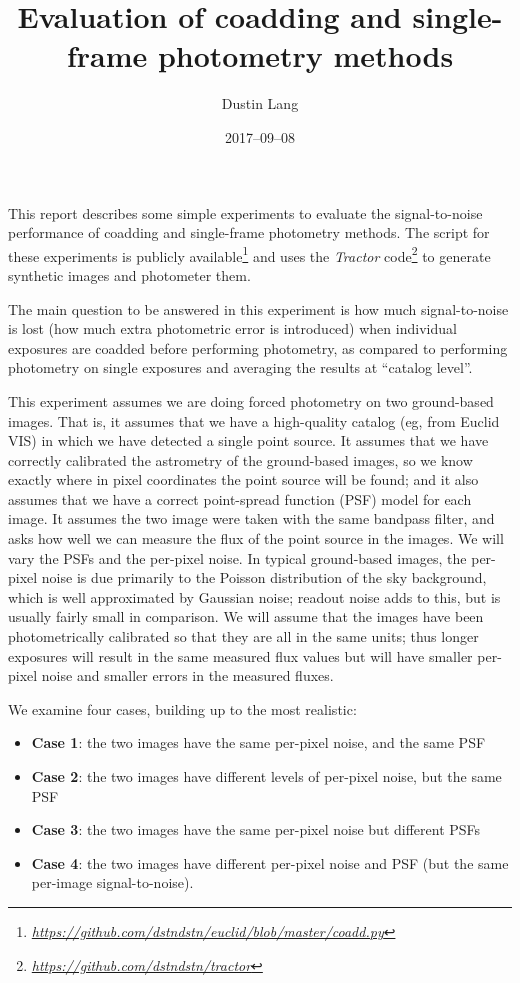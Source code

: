 \documentclass[a4paper,11pt]{article}
\author{Dustin Lang}
\date{2017--09--08}
\title{Evaluation of coadding and single-frame photometry methods}
\newcommand{\niceurl}[1]{\href{#1}{\textsl{#1}}}
\newcommand{\code}[1]{\textsl{#1}}
\begin{document}
\maketitle

This report describes some simple experiments to evaluate the
signal-to-noise performance of coadding and single-frame photometry
methods.  The script for these experiments is publicly
available\footnote{%
  \niceurl{https://github.com/dstndstn/euclid/blob/master/coadd.py}}
and uses the \code{Tractor} code\footnote{%
  \niceurl{https://github.com/dstndstn/tractor}} to generate synthetic images
and photometer them.

The main question to be answered in this experiment is how much
signal-to-noise is lost (how much extra photometric error is introduced) when
individual exposures are coadded before performing photometry, as compared to
performing photometry on single exposures and averaging the results at
``catalog level''.

This experiment assumes we are doing forced photometry on two
ground-based images.  That is, it assumes that we have a high-quality
catalog (eg, from Euclid VIS) in which we have detected a single point
source.  It assumes that we have correctly calibrated the astrometry
of the ground-based images, so we know exactly where in pixel
coordinates the point source will be found; and it also assumes that
we have a correct point-spread function (PSF) model for each image.
It assumes the two image were taken with the same bandpass filter, and
asks how well we can measure the flux of the point source in the
images.  We will vary the PSFs and the per-pixel noise.  In typical
ground-based images, the per-pixel noise is due primarily to the
Poisson distribution of the sky background, which is well approximated
by Gaussian noise; readout noise adds to this, but is usually fairly
small in comparison.  We will assume that the images have been
photometrically calibrated so that they are all in the same units;
thus longer exposures will result in the same measured flux values
but will have smaller per-pixel noise and smaller errors in the
measured fluxes.

We examine four cases, building up to the most realistic:
\begin{itemize}
\item \textbf{Case 1}: the two images have the same per-pixel noise,
  and the same PSF
\item \textbf{Case 2}: the two images have different levels of
  per-pixel noise, but the same PSF
\item \textbf{Case 3}: the two images have the same per-pixel noise
  but different PSFs
\item \textbf{Case 4}: the two images have different per-pixel noise
  and PSF (but the same per-image signal-to-noise).
\end{itemize}
\end{document}
